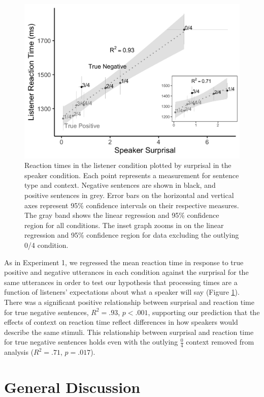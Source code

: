 \documentclass[man, floatsintext, noapacite]{apa6}
\begin{document}
\begin{figure}[t]
\begin{center} 
\includegraphics[width=5in]{figures/experiment2/speaker_v_listener.png}
\caption{\label{fig:exp2_scatter} Reaction times in the listener condition plotted by surprisal in the speaker condition. Each point represents a measurement for sentence type and context. Negative sentences are shown in black, and positive sentences in grey. Error bars on the horizontal and vertical axes represent 95\% confidence intervals on their respective measures. The gray band shows the linear regression and  95\% confidence region for all conditions. The inset graph zooms in on the linear regression and 95\% confidence region for data excluding the outlying 0/4 condition.}
\end{center} 
\end{figure}

As in Experiment 1, we regressed the mean reaction time in response to true positive and negative utterances in each condition against the surprisal for the same utterances in order to test our hypothesis that processing times are a function of listeners' expectations about what a speaker will say (Figure \ref{fig:exp2_scatter}).  There was a significant positive relationship between surprisal and reaction time for true negative sentences, $R^2=.93$, $p<.001$, supporting our prediction that the effects of context on reaction time reflect differences in how speakers would describe the same stimuli. This relationship between surprisal and reaction time for true negative sentences holds even with the outlying $\frac{0}{4}$ context removed from analysis ($R^2=.71$, $p = .017$).

\section{General Discussion}
\end{document}
